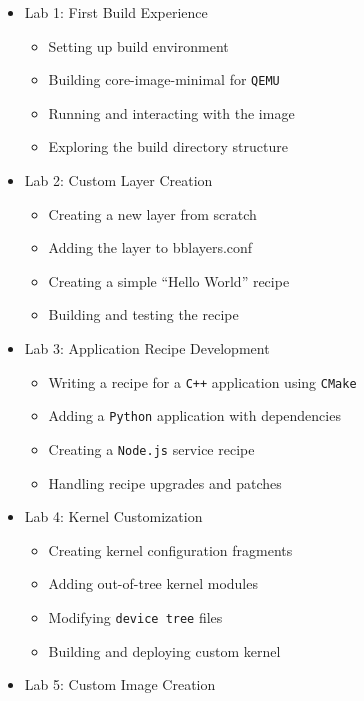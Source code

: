 \documentclass[
]{article}
\providecommand{\tightlist}{%
  \setlength{\itemsep}{0pt}\setlength{\parskip}{0pt}}
\begin{document}
\begin{itemize}
\tightlist
\item
  Lab 1: First Build Experience

  \begin{itemize}
  \tightlist
  \item
    Setting up build environment
  \item
    Building core-image-minimal for \texttt{QEMU}
  \item
    Running and interacting with the image
  \item
    Exploring the build directory structure
  \end{itemize}
\item
  Lab 2: Custom Layer Creation

  \begin{itemize}
  \tightlist
  \item
    Creating a new layer from scratch
  \item
    Adding the layer to bblayers.conf
  \item
    Creating a simple ``Hello World'' recipe
  \item
    Building and testing the recipe
  \end{itemize}
\item
  Lab 3: Application Recipe Development

  \begin{itemize}
  \tightlist
  \item
    Writing a recipe for a \texttt{C++} application using \texttt{CMake}
  \item
    Adding a \texttt{Python} application with dependencies
  \item
    Creating a \texttt{Node.js} service recipe
  \item
    Handling recipe upgrades and patches
  \end{itemize}
\item
  Lab 4: Kernel Customization

  \begin{itemize}
  \tightlist
  \item
    Creating kernel configuration fragments
  \item
    Adding out-of-tree kernel modules
  \item
    Modifying \texttt{device\ tree} files
  \item
    Building and deploying custom kernel
  \end{itemize}
\item
  Lab 5: Custom Image Creation


\end{itemize}
\end{document}
